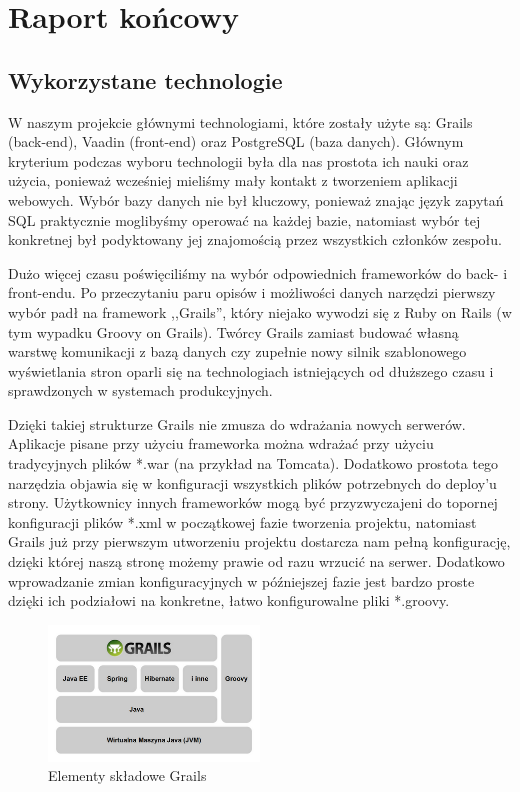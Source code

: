 
\chapter{Raport końcowy}
\label{cha:raport}

\section{Wykorzystane technologie}
\label{sec:technologie}

\hspace{15pt}W naszym projekcie głównymi technologiami, które zostały użyte są: Grails (back-end), Vaadin (front-end) oraz PostgreSQL (baza danych). Głównym kryterium podczas wyboru technologii była dla nas prostota ich nauki oraz użycia, ponieważ wcześniej mieliśmy mały kontakt z tworzeniem aplikacji webowych. Wybór bazy danych nie był kluczowy, ponieważ znając język zapytań SQL praktycznie moglibyśmy operować na każdej bazie, natomiast wybór tej konkretnej był podyktowany jej znajomością przez wszystkich członków zespołu. 

\hspace{15pt}Dużo więcej czasu poświęciliśmy na wybór odpowiednich frameworków do back- i front-endu. Po przeczytaniu paru opisów i możliwości danych narzędzi pierwszy wybór padł na framework ,,Grails'', który niejako wywodzi się z Ruby on Rails (w tym wypadku Groovy on Grails). Twórcy Grails zamiast budować własną warstwę komunikacji z bazą danych czy zupełnie nowy silnik szablonowego wyświetlania stron oparli się na technologiach istniejących od dłuższego czasu i sprawdzonych w systemach produkcyjnych. 

\hspace{15pt}Dzięki takiej strukturze Grails nie zmusza do wdrażania nowych serwerów. Aplikacje pisane przy użyciu frameworka można wdrażać przy użyciu tradycyjnych plików *.war (na przykład na Tomcata). Dodatkowo prostota tego narzędzia objawia się w konfiguracji wszystkich plików potrzebnych do deploy'u strony. Użytkownicy innych frameworków mogą być przyzwyczajeni do topornej konfiguracji plików *.xml w początkowej fazie tworzenia projektu, natomiast Grails już przy pierwszym utworzeniu projektu dostarcza nam pełną konfigurację, dzięki której naszą stronę możemy prawie od razu wrzucić na serwer. Dodatkowo wprowadzanie zmian konfiguracyjnych w późniejszej fazie jest bardzo proste dzięki ich podziałowi na konkretne, łatwo konfigurowalne pliki *.groovy. 

\begin{figure}[h!]
\begin{center}
\includegraphics[width=0.5\textwidth]{./img/grails_stack.png}
\caption{Elementy składowe Grails}
\label{fig:grails-stack}
\end{center}
\end{figure}

